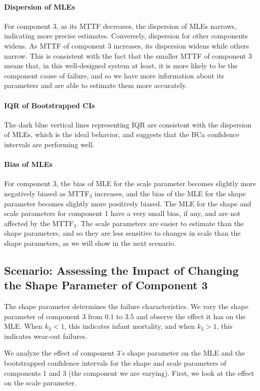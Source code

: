 \documentclass[11pt]{article}
\begin{document}
\paragraph{Dispersion of MLEs}
For component 3, as its MTTF decreases, the dispersion of MLEs narrows, indicating more precise estimates. Conversely, dispersion for other components widens. As MTTF of component 3 increases, its dispersion widens while others narrow. This is consistent with the fact that the smaller MTTF of component 3 means that, in this well-designed system at least, it is more likely to be the component cause of failure, and so we have more information about its parameters and are able to estimate them more accurately.

\paragraph{IQR of Bootstrapped CIs}
The dark blue vertical lines representing IQR are consistent with the dispersion of MLEs, which is the ideal behavior, and suggests that the BCa confidence intervals are performing well.

\paragraph{Bias of MLEs}
For component 3, the bias of MLE for the scale parameter becomes slightly more negatively biased as MTTF$_3$ increases, and the bias of the MLE for the shape parameter becomes slightly more positively biased. The MLE for the shape and scale parameters for component 1 have a very small bias, if any, and are not affected by the MTTF$_3$. The scale parameters are easier to estimate than the shape parameters, and so they are less sensitive to changes in scale than the shape parameters, as we will show in the next scenario.

\subsection{Scenario: Assessing the Impact of Changing the Shape Parameter of Component 3}
\label{shape3-vary}

The shape parameter determines the failure characteristics. We vary the shape parameter of component 3 from $0.1$ to $3.5$ and observe the effect it has on the MLE. When $k_3 < 1$, this indicates infant mortality, and when $k_3 > 1$, this indicates wear-out failures.

We analyze the effect of component 3's shape parameter on the MLE and the bootstrapped confidence intervals for the shape and scale parameters of components 1 and 3 (the component we are varying). First, we look at the effect on the scale parameter.
\end{document}
